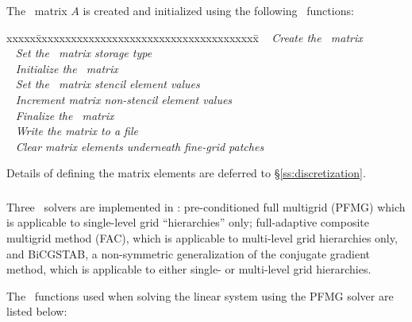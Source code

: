 \documentclass[10pt]{article}
\begin{document}
The \hypre\ matrix $A$ is created and initialized
using the following \hypre\ functions:

\begin{tabbing}
xxxxx\=xxxxxxxxxxxxxxxxxxxxxxxxxxxxxxxxxxxxxx\=\kill
\> \done\ 
   \> \textit{Create the \hypre\ matrix} \\
\> \done\ 
   \> \textit{Set the \hypre\ matrix storage type} \\
\> \done\ 
   \> \textit{Initialize the  \hypre\ matrix} \\
\> \done\ 
   \> \textit{Set the \hypre\ matrix stencil element values} \\
\> \done\ 
   \> \textit{Increment matrix non-stencil element values} \\
\> \done\ 
   \> \textit{Finalize the \hypre\ matrix} \\
\> \done\ 
   \> \textit{Write the matrix to a file} \\
\> \done\ 
   \> \textit{Clear matrix elements underneath fine-grid patches}
\end{tabbing}

Details of defining the matrix elements are deferred to \S\ref{ss:discretization}.

\subsubsection{}


Three \hypre\ solvers are implemented in :
pre-conditioned full multigrid (PFMG) which is applicable to
single-level grid ``hierarchies'' only; full-adaptive composite
multigrid method (FAC), which is applicable to multi-level grid
hierarchies only, and BiCGSTAB, a non-symmetric generalization of the
conjugate gradient method, which is applicable to either single- or
multi-level grid hierarchies.

The \hypre\ functions used when solving the linear system using
the PFMG solver are listed below:
\end{document}
